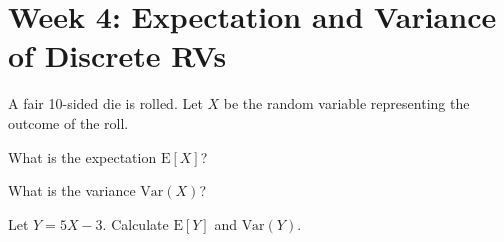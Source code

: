 \documentclass[a4paper, 10pt]{article}
\begin{document}
\subject[2110205 - Statistics for Computer Engineering]

\section{Week 4: Expectation and Variance of Discrete RVs}

\begin{problem}
A fair 10-sided die is rolled. Let \( X \) be the random variable representing the outcome of the roll.
\begin{subproblems_alpha}
	\item What is the expectation \( \text{E}[X] \)?
	\item What is the variance \( \text{Var}(X) \)?
	\item Let \( Y = 5X - 3 \). Calculate \( \text{E}[Y] \) and \( \text{Var}(Y) \).
\end{subproblems_alpha}
\end{problem}
\end{document}
